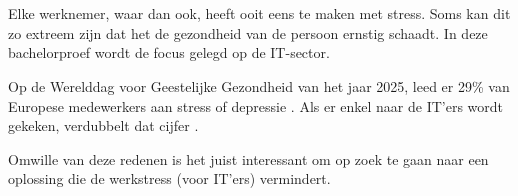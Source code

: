 
\chapter{}%
\label{ch:inleiding}
Elke werknemer, waar dan ook, heeft ooit eens te maken met stress. Soms kan dit zo extreem zijn dat het de gezondheid van de persoon ernstig schaadt. In deze bachelorproef wordt de focus gelegd op de IT-sector.

Op de Werelddag voor Geestelijke Gezondheid van het jaar 2025, leed er 29\% van Europese medewerkers aan stress of depressie \autocite{EUOSHA2025}. Als er enkel naar de IT'ers wordt gekeken, verdubbelt dat cijfer \autocite{ISACA2025}.

Omwille van deze redenen is het juist interessant om op zoek te gaan naar een oplossing die de werkstress (voor IT'ers) vermindert. 



\section{}%
\label{sec:probleemstelling}

